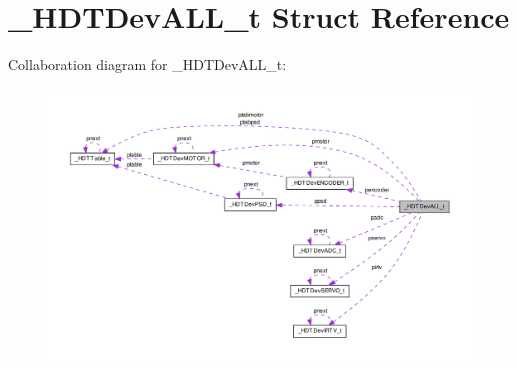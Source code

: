 \hypertarget{struct___h_d_t_dev_a_l_l__t}{\section{\-\_\-\-H\-D\-T\-Dev\-A\-L\-L\-\_\-t \-Struct \-Reference}
\label{struct___h_d_t_dev_a_l_l__t}
}


\-Collaboration diagram for \-\_\-\-H\-D\-T\-Dev\-A\-L\-L\-\_\-t\-:\nopagebreak
\begin{figure}[H]
\begin{center}
\leavevmode
\includegraphics[width=350pt]{struct___h_d_t_dev_a_l_l__t__coll__graph}
\end{center}
\end{figure}
